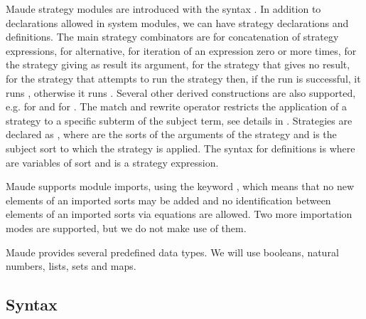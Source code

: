 Maude strategy modules are introduced with the syntax
. In addition to declarations allowed in
system modules, we can have strategy declarations and definitions.
The main strategy combinators are \code{;} for concatenation of strategy 
expressions, \code{|} for alternative, \code{*} for iteration of an
expression zero or more times,  for the strategy giving as result its argument,  for the strategy that gives no result,
 for the strategy that attempts to run the
strategy  then, if the run is successful, it runs ,
otherwise it runs .
Several other derived constructions are also
supported, e.g.  for  and  for . The match and rewrite operator 
 restricts the application of a strategy to a specific
subterm of the subject term, see details in \cite{DBLP:conf/maude/2007}.
Strategies are declared as ,
where  are the sorts of the arguments of the strategy
and  is the subject sort to which the strategy is applied.
The syntax for definitions is  where
 are variables of sort  and  is a strategy expression.


Maude supports module imports, using the keyword ,
which means that no new elements of an imported sorts may be 
added and 
no identification between elements of an imported sorts via
equations are allowed. 
Two more importation modes are supported, but we do not make use 
of them.

Maude provides several predefined data types. We will use booleans, natural
numbers, lists, sets and maps.
  
\subsection{Syntax}

